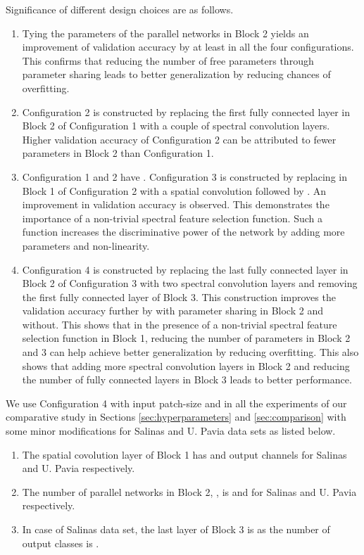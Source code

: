 \documentclass[journal]{IEEEtran}
\begin{document}
Significance of different design choices are as follows.\\

\begin{enumerate}

\item Tying the parameters of the parallel networks in Block 2 yields an improvement of validation accuracy by at least  in all the four configurations. This confirms that reducing the number of free parameters through parameter sharing leads to better generalization by reducing chances of overfitting.\\

\item Configuration 2 is constructed by replacing the first fully connected layer in Block 2 of Configuration 1 with a couple of spectral convolution layers. Higher validation accuracy of Configuration 2 can be attributed to fewer parameters in Block 2 than Configuration 1.\\

\item Configuration 1 and 2 have . Configuration 3 is constructed by replacing  in Block 1 of Configuration 2 with a  spatial convolution followed by . An improvement in validation accuracy is observed. This demonstrates the importance of a non-trivial spectral feature selection function. Such a function increases the discriminative power of the network by adding more parameters and non-linearity.\\

\item Configuration 4 is constructed by replacing the last fully connected layer in Block 2 of Configuration 3 with two spectral convolution layers and removing the first fully connected layer of Block 3. This construction improves the validation accuracy further by  with parameter sharing in Block 2 and  without. This shows that in the presence of a non-trivial spectral feature selection function in Block 1, reducing the number of parameters in Block 2 and 3 can help achieve better generalization by reducing overfitting. This also shows that adding more spectral convolution layers in Block 2 and reducing the number of fully connected layers in Block 3 leads to better performance. \\

\end{enumerate}

We use Configuration 4 with input patch-size  and  in all the experiments of our comparative study in Sections \ref{sec:hyperparameters} and \ref{sec:comparison} with some minor modifications for Salinas and U. Pavia data sets as listed below. 
\begin{enumerate}
\item The  spatial covolution layer of Block 1 has  and  output channels for Salinas and U. Pavia respectively.
\item The number of parallel networks in Block 2, , is  and  for Salinas and U. Pavia respectively.
\item In case of Salinas data set, the last layer of Block 3 is  as the number of output classes is .
\end{enumerate}
\end{document}
